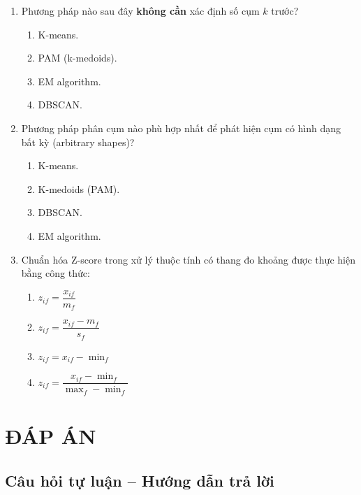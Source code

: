 \documentclass[10pt]{article}
\begin{document}
\begin{enumerate}[leftmargin=*, label=\textbf{Câu \arabic*.}]
    \item Phương pháp nào sau đây \textbf{không cần} xác định số cụm $k$ trước?
    \begin{enumerate}[label=\Alph*.]
        \item K-means.
        \item PAM (k-medoids).
        \item EM algorithm.
        \item DBSCAN.
    \end{enumerate}

    \item Phương pháp phân cụm nào phù hợp nhất để phát hiện cụm có hình dạng bất kỳ (arbitrary shapes)?
    \begin{enumerate}[label=\Alph*.]
        \item K-means.
        \item K-medoids (PAM).
        \item DBSCAN.
        \item EM algorithm.
    \end{enumerate}

    \item Chuẩn hóa Z-score trong xử lý thuộc tính có thang đo khoảng được thực hiện bằng công thức:
    \begin{enumerate}[label=\Alph*.]
        \item $z_{if} = \dfrac{x_{if}}{m_f}$
        \item $z_{if} = \dfrac{x_{if} - m_f}{s_f}$
        \item $z_{if} = x_{if} - \min_f$
        \item $z_{if} = \dfrac{x_{if} - \min_f}{\max_f - \min_f}$
    \end{enumerate}

\end{enumerate}

\newpage
\section*{ĐÁP ÁN}

\subsection*{Câu hỏi tự luận -- Hướng dẫn trả lời}
\end{document}
